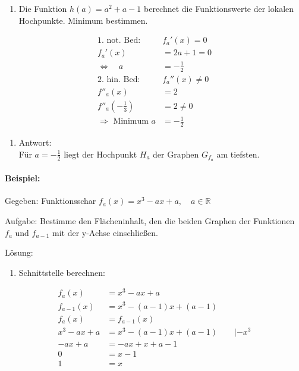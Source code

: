 \documentclass[
  letterpaper,
  DIV=11,
  numbers=noendperiod]{scrartcl}
\let\oldparagraph\paragraph
\renewcommand{\paragraph}[1]{\oldparagraph{#1}\mbox{}}
\providecommand{\tightlist}{%
  \setlength{\itemsep}{0pt}\setlength{\parskip}{0pt}}\usepackage{longtable,booktabs,array}
\begin{document}
\begin{enumerate}
\def\labelenumi{\arabic{enumi}.}
\setcounter{enumi}{1}
\tightlist
\item
  Die Funktion \(h(a)=a^2+a-1\) berechnet die Funktionswerte der lokalen
  Hochpunkte. Minimum bestimmen.
\end{enumerate}

\[
\begin{aligned}
\text{1. not. Bed: } &f_a'(x) =0\\
f_a'(x) &= 2a+1 = 0\\
\Leftrightarrow \quad  a &=-\frac{1}{2}\\ 
\text{2. hin. Bed: } &f_a''(x) \neq 0\\
f''_a(x) &= 2\\
f''_a\left(-\frac{1}{3}\right) &= 2 \neq 0\\
\Rightarrow  \text{ Minimum } a &=-\frac{1}{2}
\end{aligned}
\]

\begin{enumerate}
\def\labelenumi{\arabic{enumi}.}
\setcounter{enumi}{2}
\tightlist
\item
  Antwort:\\
  Für \(a=-\frac{1}{2}\) liegt der Hochpunkt \(H_a\) der Graphen
  \(G_{f_a}\) am tiefsten.
\end{enumerate}

\paragraph{Beispiel:}\label{beispiel-1}

Gegeben: Funktionsschar \(f_a(x)= x^3-ax+a, \quad a\in \mathbb{R}\)

Aufgabe: Bestimme den Flächeninhalt, den die beiden Graphen der
Funktionen \(f_{a}\) und \(f_{a-1}\) mit der y-Achse einschließen.

Lösung:

\begin{enumerate}
\def\labelenumi{\arabic{enumi}.}
\tightlist
\item
  Schnittstelle berechnen:
\end{enumerate}

\[
\begin{aligned}
f_{a}(x)&= x^3 -ax +a\\
f_{a-1}(x)&= x^3 -(a-1)x +(a-1)\\
f_a(x) &= f_{a-1}(x)\\
x^3 -ax +a &= x^3 -(a-1)x +(a-1)\qquad |-x^3\\
-ax+a &= -ax+x+a-1\\
0 &= x-1\\
1 &= x
\end{aligned}
\]
\end{document}
